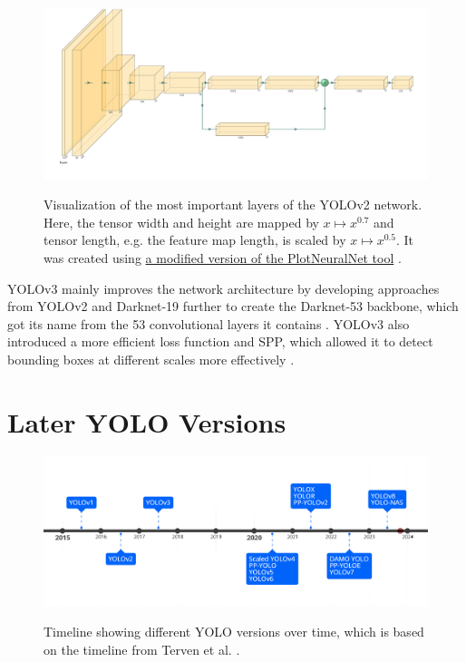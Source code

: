 \documentclass[10pt]{book}
\begin{document}
\begin{figure}
  \caption{Visualization of the most important layers of the \ac{YOLO}v2 network. Here, the tensor width and height are mapped by $x \mapsto x^{0.7}$ and tensor length, e.g. the feature map length, is scaled by $x \mapsto x^{0.5}$. It was created using \href{https://github.com/jnccd/PlotNeuralNet}{a modified version of the PlotNeuralNet tool} \cite{haris_iqbal_2018_2526396}.}
  \includegraphics[width=\textwidth]{image/yolov2}
  \label{fig:yolov2}
\end{figure}

\ac{YOLO}v3 mainly improves the network architecture by developing approaches from \ac{YOLO}v2 and Darknet-19 further to create the Darknet-53 backbone, which got its name from the 53 convolutional layers it contains \cite{redmon2018yolov3}. \ac{YOLO}v3 also introduced a more efficient loss function and \ac{SPP}, which allowed it to detect bounding boxes at different scales more effectively \cite{jani2023model}. %

\section{Later YOLO Versions}

\begin{figure}
  \caption{Timeline showing different \ac{YOLO} versions over time, which is based on the timeline from Terven et al. \cite{terven2023comprehensive}.}
  \includegraphics[width=\textwidth]{image/timeline_fix}
  \label{fig:yolo_timeline}
\end{figure}
\end{document}
